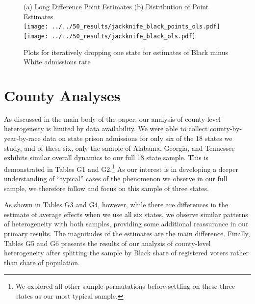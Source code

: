 \documentclass[12pt]{article}
\begin{document}
\begin{figure}[h!]
 	\begin{center}
 	\caption{ Plots for iteratively dropping one state for estimates of Black minus White admissions rate }
 	\footnotesize
		(a) Long Difference Point Estimates \hspace*{.4in} (b) Distribution of Point Estimates \\
 			\texttt{[image: ../../50\_results/jackknife\_black\_points\_ols.pdf]}
 			\texttt{[image: ../../50\_results/jackknife\_black\_ols.pdf]} \\
       \smallskip
       \label{figure_jackknife_bminusw}
       \end{center}
\end{figure} \normalsize







\section{County Analyses}\label{appendix_county}
\setcounter{table}{0}
\setcounter{figure}{0}
\renewcommand{\thetable}{G\arabic{table}}
\renewcommand{\thefigure}{G\arabic{figure}}
\normalsize

As discussed in the main body of the paper, our analysis of county-level heterogeneity is limited by data availability. We were able to collect county-by-year-by-race data on state prison admissions for only six of the 18 states we study, and of these six, only the sample of Alabama, Georgia, and Tennessee exhibits similar overall dynamics to our full 18 state sample. This is demonstrated in Tables G1 and G2.\footnote{We explored all other sample permutations before settling on these three states as our most typical sample.} As our interest is in developing a deeper understanding of ``typical'' cases of the phenomenon we observe in our full sample, we therefore follow  and focus on this sample of three states.

As shown in Tables G3 and G4, however, while there are differences in the estimate of average effects when we use all six states, we observe similar patterns of heterogeneity with both samples, providing some additional reassurance in our primary results.  The magnitudes of the estimates are the main difference.  Finally, Tables G5 and G6 presents the results of our analysis of county-level heterogeneity after splitting the sample by Black share of registered voters rather than share of population.
\end{document}
